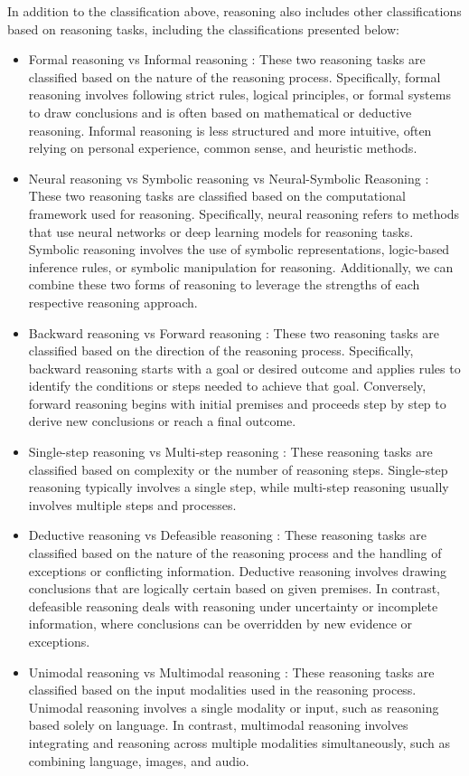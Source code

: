 In addition to the classification above, reasoning also includes other classifications based on reasoning tasks, including the classifications presented below:
\begin{itemize}
    \item Formal reasoning vs Informal reasoning \cite{back4}: These two reasoning tasks are classified based on the nature of the reasoning process. Specifically, formal reasoning involves following strict rules, logical principles, or formal systems to draw conclusions and is often based on mathematical or deductive reasoning. Informal reasoning is less structured and more intuitive, often relying on personal experience, common sense, and heuristic methods.
    \item Neural reasoning vs Symbolic reasoning vs  Neural-Symbolic Reasoning \cite{back5}: These two reasoning tasks are classified based on the computational framework used for reasoning. Specifically, neural reasoning refers to methods that use neural networks or deep learning models for reasoning tasks. Symbolic reasoning involves the use of symbolic representations, logic-based inference rules, or symbolic manipulation for reasoning. Additionally, we can combine these two forms of reasoning to leverage the strengths of each respective reasoning approach.
    \item Backward reasoning vs Forward reasoning \cite{back6}: These two reasoning tasks are classified based on the direction of the reasoning process. Specifically, backward reasoning starts with a goal or desired outcome and applies rules to identify the conditions or steps needed to achieve that goal. Conversely, forward reasoning begins with initial premises and proceeds step by step to derive new conclusions or reach a final outcome.
    \item Single-step reasoning vs Multi-step reasoning \cite{back7}: These reasoning tasks are classified based on complexity or the number of reasoning steps. Single-step reasoning typically involves a single step, while multi-step reasoning usually involves multiple steps and processes.
    \item Deductive reasoning vs Defeasible reasoning \cite{back8}: These reasoning tasks are classified based on the nature of the reasoning process and the handling of exceptions or conflicting information. Deductive reasoning involves drawing conclusions that are logically certain based on given premises. In contrast, defeasible reasoning deals with reasoning under uncertainty or incomplete information, where conclusions can be overridden by new evidence or exceptions.
    \item Unimodal reasoning vs Multimodal reasoning \cite{back9}: These reasoning tasks are classified based on the input modalities used in the reasoning process. Unimodal reasoning involves a single modality or input, such as reasoning based solely on language. In contrast, multimodal reasoning involves integrating and reasoning across multiple modalities simultaneously, such as combining language, images, and audio.
\end{itemize}

